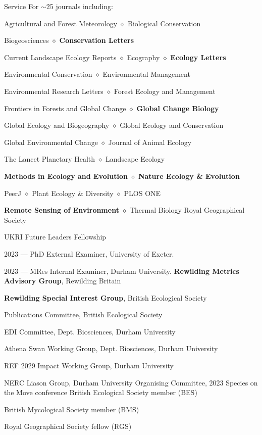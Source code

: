 
\begin{rubric}{Service}
	For $\sim$25 journals including:
	\par Agricultural and Forest Meteorology $\diamond$ Biological Conservation
	\par Biogeosciences $\diamond$ \textbf{Conservation Letters}
	\par Current Landscape Ecology Reports $\diamond$ Ecography $\diamond$ \textbf{Ecology Letters}
	\par Environmental Conservation $\diamond$ Environmental Management
	\par Environmental Research Letters $\diamond$ Forest Ecology and Management
	\par Frontiers in Forests and Global Change $\diamond$ \textbf{Global Change Biology}
	\par Global Ecology and Biogeography $\diamond$ Global Ecology and Conservation
	\par Global Environmental Change $\diamond$ Journal of Animal Ecology
	\par The Lancet Planetary Health  $\diamond$ Landscape Ecology 
	\par \textbf{Methods in Ecology and Evolution} $\diamond$ \textbf{Nature Ecology \& Evolution}
	\par PeerJ $\diamond$ Plant Ecology \& Diversity $\diamond$ PLOS ONE
	\par \textbf{Remote Sensing of Environment} $\diamond$ Thermal Biology
	Royal Geographical Society
	\par UKRI Future Leaders Fellowship 
	\par 2023 --- PhD External Examiner, University of Exeter.
	\par 2023 --- MRes Internal Examiner, Durham University.
	\textbf{Rewilding Metrics Advisory Group}, Rewilding Britain
	\par \textbf{Rewilding Special Interest Group}, British Ecological Society
	\par Publications Committee, British Ecological Society
	\par EDI Committee, Dept. Biosciences, Durham University
	\par Athena Swan Working Group, Dept. Biosciences, Durham University
	\par REF 2029 Impact Working Group, Durham University
	\par NERC Liason Group, Durham University
	Organising Committee, 2023 Species on the Move conference 
	British Ecological Society member (BES)
	\par British Mycological Society member (BMS)
	\par Royal Geographical Society fellow (RGS)
\end{rubric}

